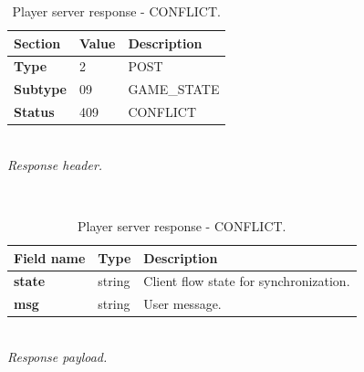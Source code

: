 \documentclass[english, sem, kiv, he, iso690alph, pdf, viewonly]{fasthesis}
\begin{document}
\begin{table}[h!]
	\centering
	\begin{minipage}[b]{1.0\textwidth}
		\centering
		\begin{tabular}{|l|l|l|}
			\hline
			\textbf{Section} & \textbf{Value} & \textbf{Description} \\ \hline
			\textbf{Type} & 2 & \footnotesize{POST} \\ \hline
			\textbf{Subtype} & 09 & \footnotesize{GAME\_STATE}  \\ \hline
			\textbf{Status} & 409 & \footnotesize{CONFLICT} \\ \hline
		\end{tabular} \\
		\textit{Response header.}
	\end{minipage} 
	\\
	\vspace{10pt}
	\begin{minipage}[b]{1.0\textwidth}
		\centering
		\begin{tabular}{|l|l|l|}
			\hline
			\textbf{Field name} & \textbf{Type} & \textbf{Description} \\ \hline
			\textbf{state} & string & Client flow state for synchronization. \\ \hline
            \textbf{msg} & string & User message. \\ \hline
		\end{tabular} \\
		\textit{Response payload.}
	\end{minipage}	
	\caption{Player server response - CONFLICT.}
	\label{tab:player_move_response_conflict}
\end{table}
\end{document}
